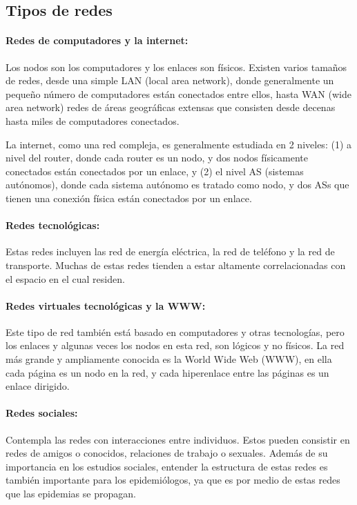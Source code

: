 \subsection{Tipos de redes}\cite{Cohen2010}
% 
% 

\paragraph{Redes de computadores y la internet:} Los nodos son los computadores y los enlaces son físicos. Existen varios tamaños de redes, desde una simple LAN (local area network), donde generalmente un pequeño número de computadores están conectados entre ellos, hasta WAN (wide area network) redes de áreas geográficas extensas que consisten desde decenas hasta miles de computadores conectados.
 
La internet, como una red compleja, es generalmente estudiada en 2 niveles: (1) a nivel del router, donde cada router es un nodo, y dos nodos físicamente conectados están conectados por un enlace, y (2) el nivel AS (sistemas autónomos), donde cada sistema autónomo es tratado como nodo, y dos ASs que tienen una conexión física están conectados por un enlace.
 
\paragraph{Redes tecnológicas:} Estas redes incluyen las red de energía eléctrica, la red de teléfono y la red de transporte. Muchas de estas redes tienden a estar altamente correlacionadas con el espacio en el cual residen.
 
\paragraph{Redes virtuales tecnológicas y la WWW:} Este tipo de red también está basado en computadores y otras tecnologías, pero los enlaces y algunas veces los nodos en esta red, son lógicos y no físicos. La red más grande y ampliamente conocida es la  World Wide Web (WWW), en ella cada página es un nodo en la red, y cada hiperenlace entre las páginas es un enlace dirigido.
 
\paragraph{Redes sociales:} Contempla las redes con interacciones entre individuos. Estos pueden consistir en redes de amigos o conocidos, relaciones de trabajo o sexuales. Además de su importancia en los estudios sociales, entender la estructura de estas redes es también importante para los epidemiólogos, ya que es por medio de estas redes que las epidemias se propagan.
 
